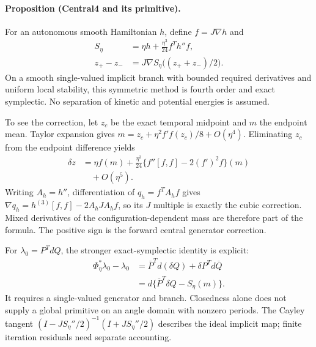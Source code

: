 \paragraph{Proposition (Central4 and its primitive).}\label{thm:central4}
For an autonomous smooth Hamiltonian $h$, define $f=J\nabla h$ and
\begin{equation}
 \begin{aligned}
 S_\eta&=\eta h+\frac{\eta^3}{24}f^Th''f,\\
 z_+-z_-&=J\nabla S_\eta\bigl((z_++z_-)/2\bigr).
\end{aligned}
 \label{eq:th-central4}
\end{equation}
On a smooth single-valued implicit branch with bounded required derivatives and uniform local stability, this symmetric method is fourth order and exact symplectic. No separation of kinetic and potential energies is assumed.

To see the correction, let $z_c$ be the exact temporal midpoint and $m$ the endpoint mean. Taylor expansion gives $m=z_c+\eta^2f'f(z_c)/8+O(\eta^4)$. Eliminating $z_c$ from the endpoint difference yields
\begin{equation}
 \begin{aligned}
 \delta z&=\eta f(m)+\frac{\eta^3}{24}
          \{f''[f,f]-2(f')^2f\}(m)\\
 &\quad+O(\eta^5).
\end{aligned}
 \label{eq:th-central-expansion}
\end{equation}
Writing $A_h=h''$, differentiation of $q_h=f^TA_hf$ gives $\nabla q_h=h^{(3)}[f,f]-2A_hJA_hf$, so its $J$ multiple is exactly the cubic correction. Mixed derivatives of the configuration-dependent mass are therefore part of the formula. The positive sign is the forward central generator correction.

For $\lambda_0=P^TdQ$, the stronger exact-symplectic identity is explicit:
\begin{equation}
 \begin{aligned}
 \Phi_\eta^*\lambda_0-\lambda_0
 &=\overline P^Td(\delta Q)+\delta P^Td\overline Q\\
 &=d\{\overline P^T\delta Q-S_\eta(m)\}.
\end{aligned}
 \label{eq:th-primitive}
\end{equation}
It requires a single-valued generator and branch. Closedness alone does not supply a global primitive on an angle domain with nonzero periods. The Cayley tangent $(I-JS_\eta''/2)^{-1}(I+JS_\eta''/2)$ describes the ideal implicit map; finite iteration residuals need separate accounting.

